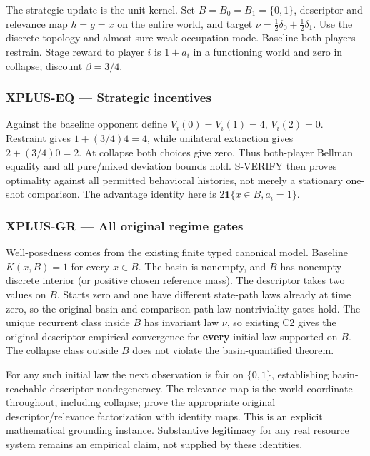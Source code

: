 \documentclass[
  11pt,
  a4paper,
]{article}
\begin{document}
The strategic update is the unit kernel. Set \(B=B_0=B_1=\{0,1\}\),
descriptor and relevance map \(h=g=x\) on the entire world, and target
\(\nu=\tfrac12\delta_0+\tfrac12\delta_1\). Use the discrete topology and
almost-sure weak occupation mode. Baseline both players restrain. Stage
reward to player \(i\) is \(1+a_i\) in a functioning world and zero in
collapse; discount \(\beta=3/4\).

\subsubsection{XPLUS-EQ --- Strategic
incentives}\label{xplus-eq-strategic-incentives}

Against the baseline opponent define \(V_i(0)=V_i(1)=4\), \(V_i(2)=0\).
Restraint gives \(1+(3/4)4=4\), while unilateral extraction gives
\(2+(3/4)0=2\). At collapse both choices give zero. Thus both-player
Bellman equality and all pure/mixed deviation bounds hold. S-VERIFY then
proves optimality against all permitted behavioral histories, not merely
a stationary one-shot comparison. The advantage identity here is
\(2\mathbf1\{x\in B,a_i=1\}\).

\subsubsection{XPLUS-GR --- All original regime
gates}\label{xplus-gr-all-original-regime-gates}

Well-posedness comes from the existing finite typed canonical model.
Baseline \(K(x,B)=1\) for every \(x\in B\). The basin is nonempty, and
\(B\) has nonempty discrete interior (or positive chosen reference
mass). The descriptor takes two values on \(B\). Starts zero and one
have different state-path laws already at time zero, so the original
basin and comparison path-law nontriviality gates hold. The unique
recurrent class inside \(B\) has invariant law \(\nu\), so existing C2
gives the original descriptor empirical convergence for \textbf{every}
initial law supported on \(B\). The collapse class outside \(B\) does
not violate the basin-quantified theorem.

For any such initial law the next observation is fair on \(\{0,1\}\),
establishing basin-reachable descriptor nondegeneracy. The relevance map
is the world coordinate throughout, including collapse; prove the
appropriate original descriptor/relevance factorization with identity
maps. This is an explicit mathematical grounding instance. Substantive
legitimacy for any real resource system remains an empirical claim, not
supplied by these identities.
\end{document}
